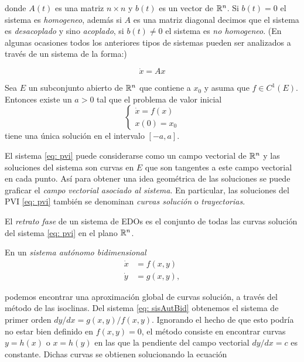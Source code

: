 donde $A(t)$ es una matriz $n \times n$ y $b(t)$ es un vector de ${\mathbb{R}}^{n}$. Si $b(t) = 0$ el sistema es \textit{homogeneo}, además si $A$ es una matriz diagonal decimos que el sistema es \textit{desacoplado} y sino \textit{acoplado}, si $b(t) \neq 0$ el sistema es \textit{no homogeneo}. (En algunas ocasiones todos los anteriores tipos de sistemas pueden ser analizados a través de un sistema de la forma:)

\begin{equation}
	\dot{x} = Ax
	\label{eq: sisLinAuto}
\end{equation}

\begin{teo}\label{teo: Existencia y unicidad}
	Sea $E$ un subconjunto abierto de ${\mathbb{R}}^{n}$ que contiene a $x_{0}$ y asuma que $f \in C^{1}(E)$. Entonces existe un $a>0$ tal que el problema de valor inicial 
	\begin{equation}
		\left\{
		\begin{aligned}
			\dot{x} = f(x) \\
			x(0) = x_{0}
		\end{aligned}
		\right.
		\label{eq: pvi}
	\end{equation}
	tiene una única solución en el intervalo $[-a,a]$.
\end{teo}

El sistema \eqref{eq: pvi} puede considerarse como un campo vectorial de ${\mathbb{R}}^{n}$ y las soluciones del sistema son curvas en $E$ que son tangentes a este campo vectorial en cada punto. Así para obtener una idea geométrica de las soluciones se puede graficar el \textit{campo vectorial asociado al sistema}. En particular, las soluciones del PVI \eqref{eq: pvi} también se denominan \textit{curvas solución} o \textit{trayectorias}.

El \textit{retrato fase} de un sistema de EDOs es el conjunto de todas las curvas solución del sistema \eqref{eq: pvi} en el plano ${\mathbb{R}}^{n}$. 

En un \textit{sistema autónomo bidimensional}
\begin{equation}
	\begin{aligned}
		\dot{x} &= f(x, y) \\
		\dot{y} &= g(x, y),
	\end{aligned}
	\label{eq: sisAutBid}
\end{equation}

podemos encontrar una aproximación global de curvas solución, a través del método de las isoclinas. Del sistema \eqref{eq: sisAutBid} obtenemos el sistema de primer orden $dy/dx = g(x, y)/f(x, y)$. Ignorando el hecho de que esto podría no estar bien definido en $f(x, y) = 0$, el método consiste en encontrar curvas $y=h(x)$ o $x=h(y)$ en las que la pendiente del campo vectorial $dy/dx = c$ es constante. Dichas curvas se obtienen solucionando la ecuación

